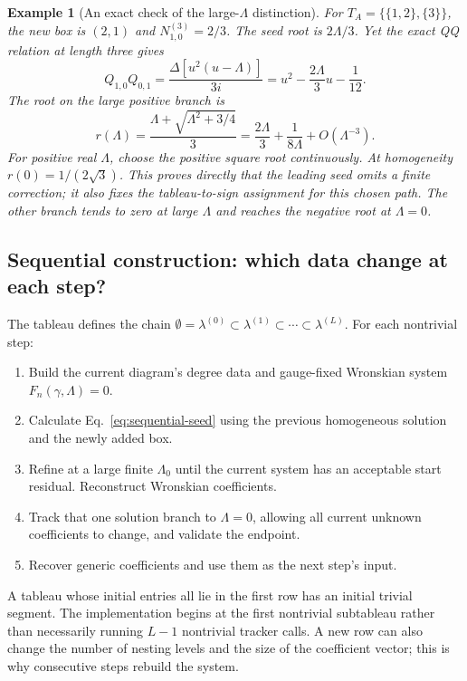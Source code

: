 \documentclass[11pt]{article}
\newtheorem{example}{Example}[section]
\begin{document}
\begin{example}[An exact check of the large-$\Lambda$ distinction]
For $T_A=\{\{1,2\},\{3\}\}$, the new box is $(2,1)$ and
$N^{(3)}_{1,0}=2/3$. The seed root is $2\Lambda/3$.
Yet the exact QQ relation at length three gives
\[
 Q_{1,0}Q_{0,1}
 =\frac{\Delta[u^2(u-\Lambda)]}{3i}
 =u^2-\frac{2\Lambda}{3}u-\frac1{12}.
\]
The root on the large positive branch is
\begin{equation}
 \label{eq:three-site-path}
 r(\Lambda)=\frac{\Lambda+\sqrt{\Lambda^2+3/4}}{3}
 =\frac{2\Lambda}{3}+\frac1{8\Lambda}+O(\Lambda^{-3}).
\end{equation}
For positive real $\Lambda$, choose the positive square root continuously.
At homogeneity $r(0)=1/(2\sqrt3)$. This proves directly that the leading
seed omits a finite correction; it also fixes the tableau-to-sign
assignment for this chosen path. The other branch tends to zero at
large $\Lambda$ and reaches the negative root at $\Lambda=0$.
\end{example}

\subsection{Sequential construction: which data change at each step?}
\label{sec:sequential}

The tableau defines the chain
$\emptyset=\lambda^{(0)}\subset\lambda^{(1)}\subset\cdots\subset\lambda^{(L)}$.
For each nontrivial step:
\begin{enumerate}
 \item Build the current diagram's degree data and gauge-fixed Wronskian
       system $F_n(\gamma,\Lambda)=0$.
 \item Calculate Eq.~\eqref{eq:sequential-seed} using the previous
       homogeneous solution and the newly added box.
 \item Refine at a large finite $\Lambda_0$ until the current system has
       an acceptable start residual. Reconstruct Wronskian coefficients.
 \item Track that one solution branch to $\Lambda=0$, allowing all current
       unknown coefficients to change, and validate the endpoint.
 \item Recover generic coefficients and use them as the next step's input.
\end{enumerate}
A tableau whose initial entries all lie in the first row has an initial
trivial segment. The implementation begins at the first nontrivial
subtableau rather than necessarily running $L-1$ nontrivial tracker calls.
A new row can also change the number of nesting levels and the size of
the coefficient vector; this is why consecutive steps rebuild the system.
\end{document}
